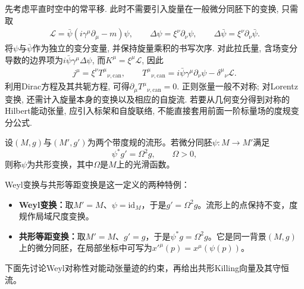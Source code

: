 \begin{example}[Dirac场的时空平移对称性]
    先考虑平直时空中的常平移. 此时不需要引入旋量在一般微分同胚下的变换, 只需取
    \begin{align}
        \mathcal L=\bar\psi(i\gamma^\mu\partial_\mu-m)\psi,
        \qquad \Delta\psi=\xi^\nu\partial_\nu\psi,
        \qquad \Delta\bar\psi=\xi^\nu\partial_\nu\bar\psi.
    \end{align}
    将$\psi$与$\bar\psi$作为独立的变分变量, 并保持旋量乘积的书写次序. 对此拉氏量, 含场变分导数的边界项为$i\bar\psi\gamma^\mu\Delta\psi$, 而$K^\mu=\xi^\mu\mathcal L$, 因此
    \begin{align}
        j^\mu=\xi^\nu T^\mu{}_{\nu,\mathrm{can}},
        \qquad
        T^\mu{}_{\nu,\mathrm{can}}
        =i\bar\psi\gamma^\mu\partial_\nu\psi
        -\delta^\mu{}_{\nu}\mathcal L.
    \end{align}
    利用Dirac方程及其共轭方程, 可得$\partial_\mu T^\mu{}_{\nu,\mathrm{can}}=0$. 正则张量一般不对称; 对Lorentz变换, 还需计入旋量本身的变换以及相应的自旋流. 若要从几何变分得到对称的Hilbert能动张量, 应引入标架和自旋联络, 不能直接套用前面一阶标量场的度规变分公式.
\end{example}

\begin{definition}[共形变换]
    设$(M,g)$与$(M',g')$为两个带度规的流形。若微分同胚$\psi:M\to M'$满足
    \begin{equation}
        \psi^*g'=\Omega^2g,\qquad\Omega>0,
    \end{equation}
    则称$\psi$为共形变换，其中$\Omega$是$M$上的光滑函数。
\end{definition}
Weyl变换与共形等距变换是这一定义的两种特例\cite{LinkConformalZhihu}：
\begin{itemize}
    \item \textbf{Weyl变换：}取$M'=M$、$\psi=\mathrm{id}_M$，于是$g'=\Omega^2g$。流形上的点保持不变，度规作局域尺度变换。
    \item \textbf{共形等距变换：}取$M'=M$、$g'=g$，于是$\psi^*g=\Omega^2g$。它是同一背景$(M,g)$上的微分同胚，在局部坐标中可写为$x'^\mu(p)=x^\mu(\psi(p))$。
\end{itemize}
下面先讨论Weyl对称性对能动张量迹的约束，再给出共形Killing向量及其守恒流。

